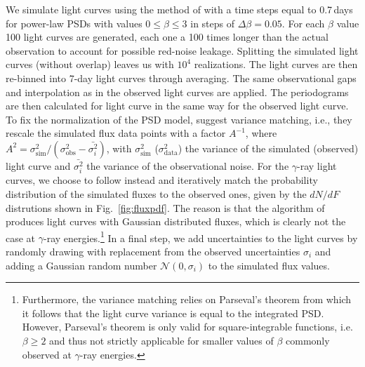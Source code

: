 \documentclass[twocolumn]{aastex62}
\newcommand{\gray}{$\gamma$-ray\xspace}
\begin{document}
We simulate light curves using the method of \citet{1995A&A...300..707T} with a time steps equal to 0.7\,days for power-law PSDs with values $0 \leqslant \beta \leqslant 3$ in steps of $\Delta\beta = 0.05$. For each $\beta$ value 100 light curves are generated, each one a 100 times longer than the actual observation to account for possible red-noise leakage. Splitting the simulated light curves (without overlap) leaves us with $10^4$ realizations. 
The light curves are then re-binned into 7-day light curves through averaging. The same observational gaps and interpolation as in the observed light curves are applied. 
The periodograms are then calculated for light curve in the same way for the observed light curve.
To fix the normalization of the PSD model, \citet{2014MNRAS.445..437M} suggest variance matching, i.e., they rescale the simulated flux data points with a factor $A^{-1}$, where $A^2 = \sigma_\mathrm{sim}^2 / (\sigma_\mathrm{obs}^2 - \bar{\sigma_i^2})$, with $\sigma_\mathrm{sim}^2$ ($\sigma_\mathrm{data}^2$) the variance of the simulated (observed) light curve and $\bar{\sigma_i^2}$ the variance of the observational noise.
For the \gray light curves, we choose to follow \citet{2013MNRAS.433..907E} instead and iteratively match the probability distribution of the simulated fluxes to the observed ones, given by the $dN/dF$ distrutions shown in Fig.~\ref{fig:fluxpdf}. 
The reason is that the algorithm of \citet{1995A&A...300..707T} produces light curves with Gaussian distributed fluxes, which is clearly not the case at \gray energies.\footnote{Furthermore, the variance matching relies on Parseval's theorem from which it follows that the light curve variance is equal to the integrated PSD. However, Parseval's theorem is only valid for square-integrable functions, i.e. $\beta \geqslant 2$ and thus not strictly applicable for smaller values of $\beta$ commonly observed at \gray energies.}
In a final step, we add uncertainties to the light curves by randomly drawing with replacement from the observed uncertainties $\sigma_i$ and adding a Gaussian random number $\mathcal{N}(0,\sigma_i)$ to the simulated flux values.
\end{document}
